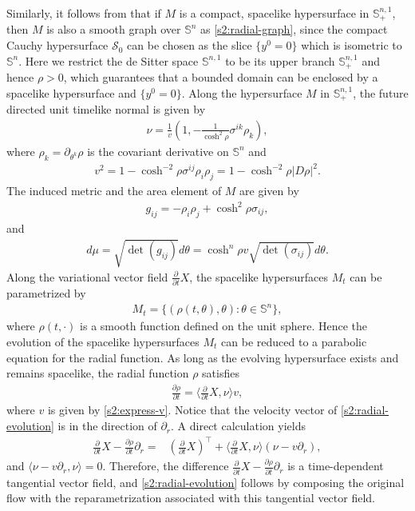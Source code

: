 \documentclass[11pt,reqno]{amsart}
\theoremstyle{definition}
\theoremstyle{remark}
\numberwithin{equation}{section}
\renewcommand{\(}{\left(}
\renewcommand{\)}{\right)}
\renewcommand{\~}{\tilde}
\renewcommand{\-}{\overline}
\renewcommand{\t}{\theta}
\newcommand{\s}{\sigma}
\begin{document}
Similarly, it follows from \cite[Proposition 1.6.3, Remark 1.6.4]{Gerh06} that if $M$ is a compact, spacelike hypersurface in $\mathbb S_{+}^{n,1}$, then $M$ is also a smooth graph over $\mathbb S^n$ as \eqref{s2:radial-graph}, since the compact Cauchy hypersurface $\mathcal{S}_0$ can be chosen as the slice $\{y^0=0\}$ which is isometric to $\mathbb S^n$. Here we restrict the de Sitter space $\mathbb S^{n,1}$ to be its upper branch $\mathbb S^{n,1}_{+}$ and hence $\rho>0$, which guarantees that a bounded domain can be enclosed by a spacelike hypersurface and $\{y^0=0\}$. Along the hypersurface $M$ in $\mathbb S^{n,1}_{+}$, the future directed unit timelike normal is given by
\begin{align}\label{s2:unit-normal-de-Sitter}
\nu=\frac{1}{v}\( 1, -\frac{1}{\cosh^2 \rho}\s^{ik}\rho_k\),
\end{align}
where $\rho_k=\partial_{\t^k}\rho$ is the covariant derivative on $\mathbb S^n$ and
\begin{align}\label{s2:express-v}
v^2=1-\cosh^{-2}\rho \s^{ij}\rho_i \rho_j=1-\cosh^{-2}\rho|D\rho|^2.
\end{align}
The induced metric and the area element of $M$ are given by
\begin{align*}
g_{ij}=-\rho_i\rho_j+\cosh^2 \rho \s_{ij},
\end{align*}
and 
\begin{align}\label{s2:area-element}
d\mu=\sqrt{\det(g_{ij})}d\t=\cosh^n \rho v \sqrt{\det(\s_{ij})} d\t.
\end{align}
Along the variational vector field $\frac{\partial}{\partial t}X$, the spacelike hypersurfaces $M_t$ can be parametrized by 
\begin{align*}
M_t=\{(\rho(t,\t),\t): \t\in \mathbb S^n \},
\end{align*}
where $\rho(t,\cdot)$ is a smooth function defined on the unit sphere. Hence the evolution of the spacelike hypersurfaces $M_t$ can be reduced to a parabolic equation for the radial function. As long as the evolving hypersurface exists and remains spacelike, the radial function $\rho$ satisfies 
\begin{align}\label{s2:radial-evolution}
\frac{\partial \rho}{\partial t}=\langle \frac{\partial}{\partial t}X,\nu\rangle v,
\end{align}
where $v$ is given by \eqref{s2:express-v}. Notice that the velocity vector of \eqref{s2:radial-evolution} is in the direction of $\partial_r$. A direct calculation yields
\begin{align*}
\frac{\partial}{\partial t}X-\frac{\partial \rho}{\partial t}\partial_r
=&(\frac{\partial}{\partial t}X)^\top+\langle \frac{\partial}{\partial t}X,\nu\rangle(\nu-v\partial_r),
\end{align*}
and $\langle \nu-v\partial_r,\nu\rangle=0$. Therefore, the difference $\frac{\partial}{\partial t}X-\frac{\partial \rho}{\partial t}\partial_r$ is a time-dependent tangential vector field, and \eqref{s2:radial-evolution} follows by composing the original flow with the reparametrization associated with this tangential vector field.
\end{document}
